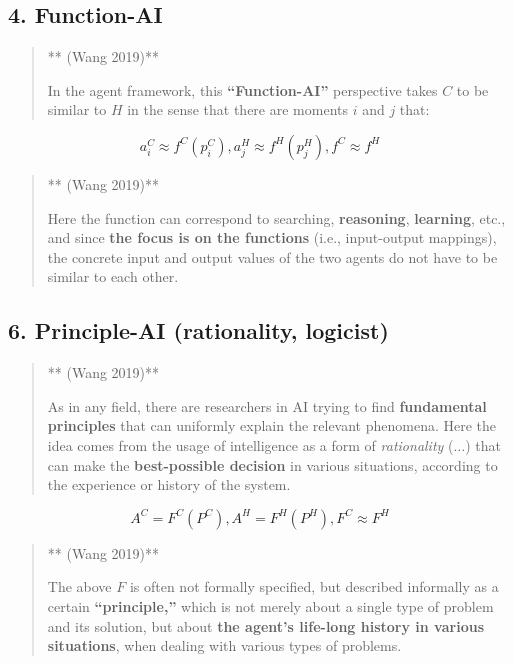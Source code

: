 \documentclass[
  letterpaper,
  DIV=11,
  numbers=noendperiod]{scrartcl}
\begin{document}
\subsection{4. Function-AI}\label{function-ai}

\begin{quote}
** (Wang 2019)**

In the agent framework, this \textbf{``Function-AI''} perspective takes
\(C\) to be similar to \(H\) in the sense that there are moments \(i\)
and \(j\) that:
\end{quote}

\[
 a_i^C \approx f^C(p_i^C), a_j^H \approx f^H(p_j^H), f^C \approx f^H
\]

\begin{quote}
** (Wang 2019)**

Here the function can correspond to searching, \textbf{reasoning},
\textbf{learning}, etc., and since \textbf{the focus is on the
functions} (i.e., input-output mappings), the concrete input and output
values of the two agents do not have to be similar to each other.
\end{quote}

\subsection{6. Principle-AI (rationality,
logicist)}\label{principle-ai-rationality-logicist}

\begin{quote}
** (Wang 2019)**

As in any field, there are researchers in AI trying to find
\textbf{fundamental principles} that can uniformly explain the relevant
phenomena. Here the idea comes from the usage of intelligence as a form
of \emph{rationality} (\(\ldots\)) that can make the
\textbf{best-possible decision} in various situations, according to the
experience or history of the system.
\end{quote}

\[
 A^C = F^C(P^C), A^H = F^H(P^H), F^C \approx F^H
\]

\begin{quote}
** (Wang 2019)**

The above \(F\) is often not formally specified, but described
informally as a certain \textbf{``principle,''} which is not merely
about a single type of problem and its solution, but about \textbf{the
agent's life-long history in various situations}, when dealing with
various types of problems.
\end{quote}
\end{document}
